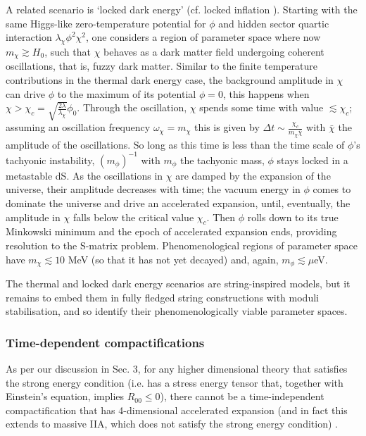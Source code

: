 A related scenario is `locked dark energy' \cite{Axenides:2004kb} (cf. locked inflation \cite{Dvali:2003vv}). Starting with the same Higgs-like zero-temperature potential for $\phi$ and hidden sector quartic interaction $\lambda_\chi \phi^2 \chi^2$, one considers a region of parameter space where now $m_\chi \gtrsim H_0$, such that $\chi$ behaves as a dark matter field undergoing coherent oscillations, that is, fuzzy dark matter. Similar to the finite temperature contributions in the thermal dark energy case, the background amplitude in $\chi$ can drive $\phi$ to the maximum of its potential $\phi=0$, this happens when $\chi > \chi_c = \sqrt{\frac{2\lambda}{\lambda_\chi}}\phi_0$. Through the oscillation, $\chi$ spends some time with value $\lesssim \chi_c$; assuming an oscillation frequency $\omega_\chi = m_\chi$ this is given by $\Delta t \sim \frac{\chi_c}{m_\chi \bar{\chi}}$ with $\bar{\chi}$ the amplitude of the oscillations. So long as this time is less than the time scale of $\phi$'s tachyonic instability, $(m_\phi)^{-1}$ with $m_\phi$ the tachyonic mass, $\phi$ stays locked in a metastable dS. As the oscillations in $\chi$ are damped by the expansion of the universe, their amplitude decreases with time; the vacuum energy in $\phi$ comes to dominate the universe and drive an accelerated expansion, until, eventually, the amplitude in $\chi$ falls below the critical value $\chi_c$. Then $\phi$ rolls down to its true Minkowski minimum and the epoch of accelerated expansion ends, providing resolution to the S-matrix problem.  Phenomenological regions of parameter space have $m_\chi \lesssim 10$ MeV (so that it has not yet decayed) and, again, $m_\phi \lesssim \mu$eV.

The thermal and locked dark energy scenarios are string-inspired models, but it remains to embed them in fully fledged string constructions with moduli stabilisation, and so identify their phenomenologically viable parameter spaces.


\subsubsection{Time-dependent compactifications}

As per our discussion in Sec. 3, for any higher dimensional theory that satisfies the strong energy condition (i.e. has a stress energy tensor that, together with Einstein's equation, implies $R_{00} \leq 0$), there cannot be a time-independent compactification that has 4-dimensional accelerated expansion (and in fact this extends to massive IIA, which does not satisfy the strong energy condition) \cite{Gibbons:1984kp, Maldacena:2000mw}.  

